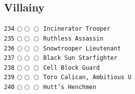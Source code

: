 \documentclass[a4paper,landscape]{article}
\begin{document}
\begin{multicols*}{5}
\section{Villainy} 
\vspace{-2mm} 
\texttt{234} \(\bigcirc\!\bigcirc\!\bigcirc\)  \texttt{Incinerator Trooper} \vspace{-0.3mm}\\ 
\texttt{235} \(\bigcirc\!\bigcirc\!\bigcirc\)  \texttt{Ruthless Assassin} \vspace{-0.3mm}\\ 
\texttt{236} \(\bigcirc\!\bigcirc\!\bigcirc\)  \texttt{Snowtrooper Lieutenant} \vspace{-0.3mm}\\ 
\texttt{237} \(\bigcirc\!\bigcirc\!\bigcirc\)  \texttt{Black Sun Starfighter} \vspace{-0.3mm}\\ 
\texttt{238} \(\bigcirc\!\bigcirc\!\bigcirc\)  \texttt{Cell Block Guard} \vspace{-0.3mm}\\ 
\texttt{239} \(\bigcirc\!\bigcirc\!\bigcirc\)  \texttt{Toro Calican, Ambitious U} \vspace{-0.3mm}\\ 
\texttt{240} \(\bigcirc\!\bigcirc\!\bigcirc\)  \texttt{Hutt’s Henchmen} \vspace{-0.3mm}\\ 

\end{multicols*}
\end{document}
